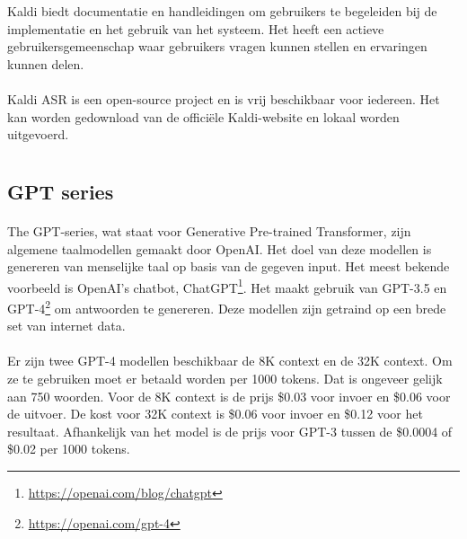 Kaldi biedt documentatie en handleidingen om gebruikers te begeleiden bij de implementatie en het gebruik van het systeem. Het heeft een actieve gebruikersgemeenschap waar gebruikers vragen kunnen stellen en ervaringen kunnen delen.

\paragraph{}
Kaldi ASR is een open-source project en is vrij beschikbaar voor iedereen. Het kan worden gedownload van de officiële Kaldi-website en lokaal worden uitgevoerd.


\section{} \label{sec:Natural Language Classifier}%

\subsection{GPT series}%

\paragraph{}
The GPT-series, wat staat voor Generative Pre-trained Transformer, zijn algemene taalmodellen gemaakt door OpenAI. Het doel van deze modellen is genereren van menselijke taal op basis van de gegeven input. Het meest bekende voorbeeld is OpenAI's chatbot, ChatGPT\footnote{\href{https://openai.com/blog/chatgpt}{https://openai.com/blog/chatgpt}}. Het  maakt gebruik van GPT-3.5 en GPT-4\footnote{\href{https://openai.com/gpt-4}{https://openai.com/gpt-4}} om antwoorden te genereren. Deze modellen zijn getraind op een brede set van internet data.

\paragraph{}
Er zijn twee GPT-4 modellen beschikbaar de 8K context en de 32K context. Om ze te gebruiken moet er betaald worden per 1000 tokens. Dat is ongeveer gelijk aan 750 woorden. Voor de 8K context is de prijs \$0.03 voor invoer en \$0.06 voor de uitvoer. De kost voor 32K context is \$0.06 voor invoer en \$0.12 voor het resultaat. Afhankelijk van het model is de prijs voor GPT-3 tussen de \$0.0004 of \$0.02 per 1000 tokens.

